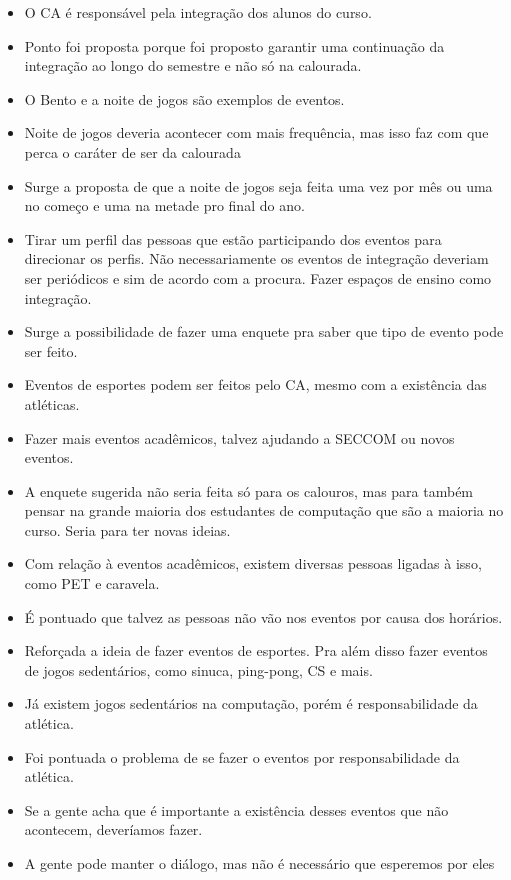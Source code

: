 \documentclass{ata-calico}
\begin{document}
\begin{itemize}
\item O CA é responsável pela integração dos alunos do curso.
\item Ponto foi proposta porque foi proposto garantir uma continuação da integração
  ao longo do semestre e não só na calourada.
\item O Bento e a noite de jogos são exemplos de eventos.
\item Noite de jogos deveria acontecer com mais frequência, mas isso faz com que
  perca o caráter de ser da calourada
\item Surge a proposta de que a noite de jogos seja feita uma vez por mês ou uma no começo e uma na
  metade pro final do ano.
\item Tirar um perfil das pessoas que estão participando dos eventos para
  direcionar os perfis. Não necessariamente os eventos de integração deveriam
  ser periódicos e sim de acordo com a procura. Fazer espaços de ensino como
  integração.
\item Surge a possibilidade de fazer uma enquete pra saber que tipo de evento pode
  ser feito.
\item Eventos de esportes podem ser feitos pelo CA, mesmo com a existência das
  atléticas.
\item Fazer mais eventos acadêmicos, talvez ajudando a SECCOM ou novos eventos.
\item A enquete sugerida não seria feita só para os calouros, mas para também
  pensar na grande maioria dos estudantes de computação que são a maioria no
  curso. Seria para ter novas ideias.
\item Com relação à eventos acadêmicos, existem diversas pessoas ligadas à isso, como PET e caravela.
\item É pontuado que talvez as pessoas não vão nos eventos por causa dos horários.
\item Reforçada a ideia de fazer eventos de esportes. Pra além disso fazer eventos
  de jogos sedentários, como sinuca, ping-pong, CS e mais.
\item Já existem jogos sedentários na computação, porém é responsabilidade da
  atlética.
\item Foi pontuada o problema de se fazer o eventos por responsabilidade da
  atlética.
\item Se a gente acha que é importante a existência desses eventos que não
  acontecem, deveríamos fazer.
\item A gente pode manter o diálogo, mas não é necessário que esperemos por eles

\end{itemize}
\end{document}
